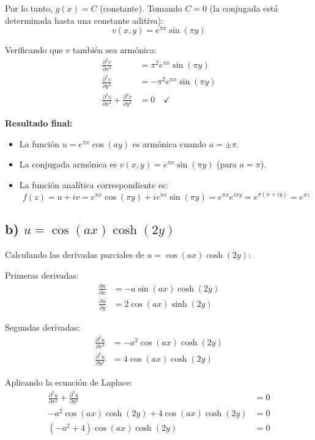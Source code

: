 \documentclass{article}
\begin{document}
Por lo tanto, $g(x) = C$ (constante). Tomando $C = 0$ (la conjugada está determinada hasta una constante aditiva):
$$v(x,y) = e^{\pi x}\sin(\pi y)$$

Verificando que $v$ también sea armónica:
\begin{align*}
\frac{\partial^2 v}{\partial x^2} &= \pi^2 e^{\pi x}\sin(\pi y) \\
\frac{\partial^2 v}{\partial y^2} &= -\pi^2 e^{\pi x}\sin(\pi y) \\
\frac{\partial^2 v}{\partial x^2} + \frac{\partial^2 v}{\partial y^2} &= 0 \quad \checkmark
\end{align*}

\textbf{Resultado final:}
\begin{itemize}
\item La función $u = e^{\pi x}\cos(ay)$ es armónica cuando $a = \pm \pi$.
\item La conjugada armónica es $v(x,y) = e^{\pi x}\sin(\pi y)$ (para $a = \pi$).
\item La función analítica correspondiente es:
$$f(z) = u + iv = e^{\pi x}\cos(\pi y) + ie^{\pi x}\sin(\pi y) = e^{\pi x}e^{i\pi y} = e^{\pi(x + iy)} = e^{\pi z}$$
\end{itemize}

\subsection*{b) $u = \cos(ax)\cosh(2y)$}

Calculando las derivadas parciales de $u = \cos(ax)\cosh(2y)$:

Primeras derivadas:
\begin{align*}
\frac{\partial u}{\partial x} &= -a\sin(ax)\cosh(2y) \\
\frac{\partial u}{\partial y} &= 2\cos(ax)\sinh(2y)
\end{align*}

Segundas derivadas:
\begin{align*}
\frac{\partial^2 u}{\partial x^2} &= -a^2\cos(ax)\cosh(2y) \\
\frac{\partial^2 u}{\partial y^2} &= 4\cos(ax)\cosh(2y)
\end{align*}

Aplicando la ecuación de Laplace:
\begin{align*}
\frac{\partial^2 u}{\partial x^2} + \frac{\partial^2 u}{\partial y^2} &= 0 \\
-a^2\cos(ax)\cosh(2y) + 4\cos(ax)\cosh(2y) &= 0 \\
(-a^2 + 4)\cos(ax)\cosh(2y) &= 0
\end{align*}
\end{document}
